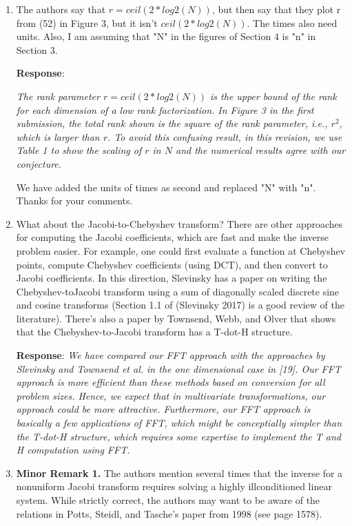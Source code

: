 \documentclass[11pt]{article}
\newcommand{\Response}{{\bf Response}}
\begin{document}
\begin{enumerate}
\item The authors say that $r = ceil(2*log2(N))$, but then say that they plot r from
(52) in Figure 3, but it isn’t $ceil(2*log2(N))$. The times also need units. Also, I am assuming that "N" in the figures of Section 4 is "n" in Section 3.


\Response: {\it  The rank parameter $r = ceil(2*log2(N))$ is the upper bound of the rank for each dimension of a low rank factorization. In Figure 3 in the first submission, the total rank shown is the square of the rank parameter, i.e., $r^2$, which is larger than $r$. To avoid this confusing result, in this revision, we use Table 1 to show the scaling of $r$ in $N$ and the numerical results agree with our conjecture.

We have added the units of times as second and replaced "N" with "n". Thanks for your comments.}

\item What about the Jacobi-to-Chebyshev transform? There are other approaches for computing the Jacobi coefficients, which are fast
and make the inverse problem easier. For example, one could first evaluate a function at Chebyshev points, compute Chebyshev
coefficients (using DCT), and then convert to Jacobi coefficients. In this direction, Slevinsky has a paper on writing the Chebyshev-toJacobi transform using a sum of diagonally scaled discrete sine and cosine transforms (Section 1.1 of (Slevinsky 2017) is a good
review of the literature). There’s also a paper by Townsend, Webb, and Olver that shows that the Chebyshev-to-Jacobi transform has
a T-dot-H structure.

\Response: {\it We have compared our FFT approach with the approaches by Slevinsky and Townsend et al. in the one dimensional case in [19]. Our FFT approach is more efficient than these methods based on conversion for all problem sizes. Hence, we expect that in multivariate transformations, our approach could be more attractive. Furthermore, our FFT approach is basically a few applications of FFT, which might be conceptially simpler than the T-dot-H structure, which requires some expertise to implement the T and H computation using FFT. }

\item \textbf{Minor Remark 1.} The authors mention several times that the inverse for a nonuniform Jacobi transform requires solving a highly illconditioned linear system. While strictly correct, the authors may want to be aware of the relations in Potts, Steidl, and Tasche’s paper from 1998 (see page 1578). {\color{red}{In particular, that paper shows them that WJ is the inverse of J in the uniform case, and generalizes this observation to other nodes from interpolative quadrature rules.}}


\end{enumerate}
\end{document}
